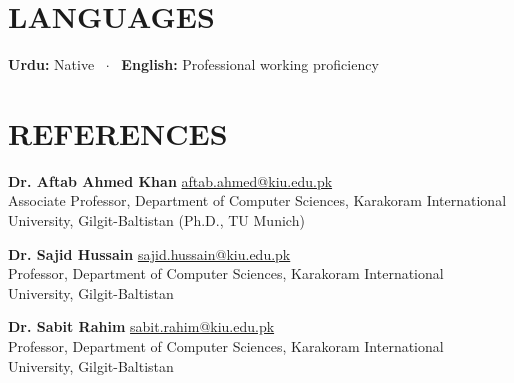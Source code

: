 \documentclass[a4paper,10pt]{article}
\begin{document}
\section{LANGUAGES}
\textbf{Urdu:} Native \ $\cdot$ \ \textbf{English:} Professional working proficiency

\section{REFERENCES}
\noindent \textbf{Dr. Aftab Ahmed Khan} \hfill \href{mailto:aftab.ahmed@kiu.edu.pk}{aftab.ahmed@kiu.edu.pk} \\
Associate Professor, Department of Computer Sciences, Karakoram International University, Gilgit-Baltistan (Ph.D., TU Munich)

\vspace{4pt}
\noindent \textbf{Dr. Sajid Hussain} \hfill \href{mailto:sajid.hussain@kiu.edu.pk}{sajid.hussain@kiu.edu.pk} \\
Professor, Department of Computer Sciences, Karakoram International University, Gilgit-Baltistan

\vspace{4pt}
\noindent \textbf{Dr. Sabit Rahim} \hfill \href{mailto:sabit.rahim@kiu.edu.pk}{sabit.rahim@kiu.edu.pk} \\
Professor, Department of Computer Sciences, Karakoram International University, Gilgit-Baltistan
\end{document}
